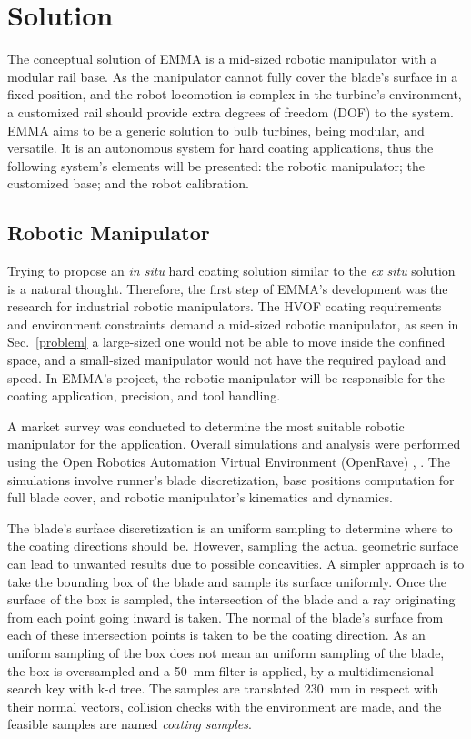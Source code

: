 \section{Solution}\label{solution}


The conceptual solution of EMMA is a mid-sized robotic manipulator with a
modular rail base. As the manipulator cannot fully cover the blade's surface in
a fixed position, and the robot locomotion is complex in the turbine's
environment, a customized rail should provide extra degrees of freedom (DOF) to
the system. EMMA aims to be a generic solution to bulb turbines, being modular,
and versatile. It is an autonomous system for hard coating applications, thus
the following system's elements will be presented: the robotic manipulator; the
customized base; and the robot calibration.


\subsection{Robotic Manipulator}\label{manipulator}
Trying to propose an \textit{in situ} hard coating solution similar to
the \textit{ex situ} solution is a natural thought. Therefore, the first step of
EMMA's development was the research for industrial robotic manipulators. The
HVOF coating requirements and environment constraints demand a mid-sized
robotic manipulator, as seen in Sec.~\ref{problem} a large-sized one would not
be able to move inside the confined space, and a small-sized manipulator would not
have the required payload and speed. In EMMA's project, the
robotic manipulator will be responsible for the coating application, precision, and tool handling.

A market survey was conducted to determine the most suitable robotic
manipulator for the application. Overall simu\-lations and analysis were performed using the Open
Robotics Automation Virtual Environment (OpenRave) \cite{diankov2008openrave}, .
The simulations involve runner's blade discretization, base
positions computation for full blade cover, and robotic manipulator's kinematics
and dynamics. 

The blade's surface discretization is an uniform sampling to
determine where to the coating directions should be. However, sampling the
actual geometric surface can lead to unwanted results due to possible
concavities. A simpler approach is to take the bounding box of the blade and
sample its surface uniformly. Once the
surface of the box is sampled, the intersection of the blade and a ray
originating from each point going inward is taken. The normal of the blade's
surface from each of these intersection points is taken to be the coating
direction. As an uniform sampling of the box does not mean an uniform sampling
of the blade, the box is oversampled and a 50~mm filter is applied, by a multidimensional search key with k-d tree.
The samples are translated 230~mm in respect with their normal vectors,
collision checks with the environment are made, and the feasible samples are
named \textit{coating samples}. 

